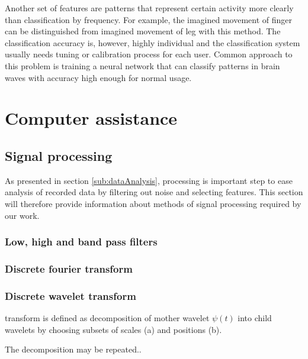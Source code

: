 Another set of features are patterns that represent certain activity more
clearly than classification by frequency. For example, the imagined movement of
finger can be distinguished from imagined movement of leg with this method. The
classification accuracy is, however, highly individual and the classification
system usually needs tuning or calibration process for each user. \cite{bcComm}
Common approach to this problem is training a neural network that can classify
patterns in brain waves with accuracy high enough for normal usage.

\chapter{Computer assistance}
\section{Signal processing}
\label{sec:sigProc}
As presented in section \ref{sub:dataAnalysis}, processing is important
step to ease analysis of recorded data by filtering out noise and selecting
features. This section will therefore provide information about methods of
signal processing required by our work.


\subsection{Low, high and band pass filters}

\subsection{Discrete fourier transform}

\subsection{Discrete wavelet transform}
transform is defined as decomposition of mother wavelet $\psi(t)$ into child
wavelets by choosing subsets of scales (a) and positions (b). 

The decomposition may be repeated..
